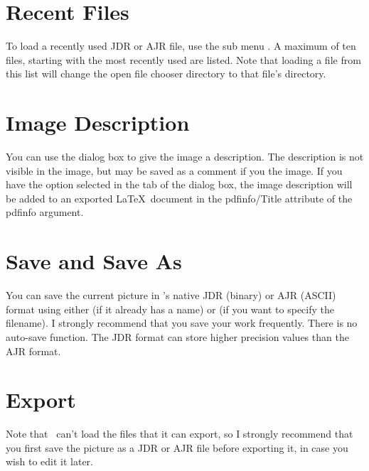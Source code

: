 \section{Recent Files}\label{sec:recentfiles}


To load a recently used \gls{JDR} or \gls{AJR} file, use the sub
menu . A maximum of ten files, starting with the
most recently used are listed. Note that loading a file from this
list will change the open file chooser directory to that file's
directory.

\section{Image Description}\label{sec:imagedescription}


You can use the  dialog box to give the
image a description. The description is not visible in the image,
but may be saved as a comment if you  the image. If you have the
 option selected in the
 tab of the  dialog box,
the image description will be added to an exported \LaTeX\ document
in the \gls{pdfinfo/Title} attribute of the \gls{pdfinfo} argument.

\section{Save and Save As}\label{sec:saveimage}


You can save the current picture in \FlowframTk's native
\gls{JDR} (binary) or \gls{AJR} (ASCII) format using either
 (if it already has a name)
or  (if you want to specify the
filename).  I strongly recommend that you save your work frequently.
There is no auto-save function. The \gls{JDR} format can store
higher precision values than the \gls{AJR} format.

\section{Export}\label{sec:exportimage}


\begin{warning}
Note that \FlowframTk\ can't load the files that it can export, so I
strongly recommend that you first save the picture as a
\gls{JDR} or \gls{AJR} file before exporting it, in case you
wish to edit it later.
\end{warning}

